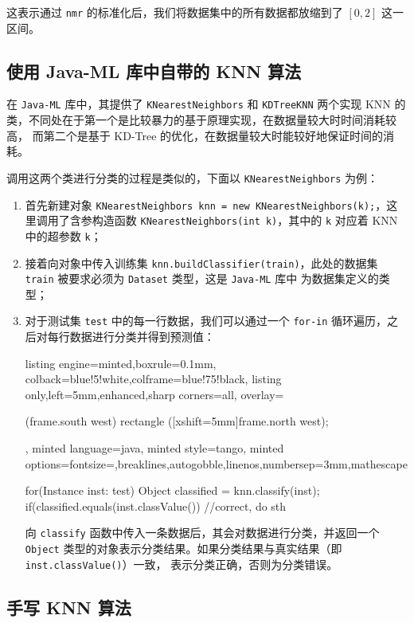 \documentclass[a4paper, 11pt, cn]{elegantpaper}
\begin{document}
这表示通过 \texttt{nmr} 的标准化后，我们将数据集中的所有数据都放缩到了 $[0, 2]$ 这一区间。
\subsection{使用 Java-ML 库中自带的 KNN 算法}

在 \texttt{Java-ML} 库中，其提供了 \texttt{KNearestNeighbors} 和 \texttt{KDTreeKNN} 两个实现 KNN 的类，不同处在于第一个是比较暴力的基于原理实现，在数据量较大时时间消耗较高，
而第二个是基于 KD-Tree 的优化，在数据量较大时能较好地保证时间的消耗。

调用这两个类进行分类的过程是类似的，下面以 \texttt{KNearestNeighbors} 为例：
\begin{enumerate}
    \item 首先新建对象 \texttt{KNearestNeighbors knn = new KNearestNeighbors(k);}，这里调用了含参构造函数 \texttt{KNearestNeighbors(int k)}，其中的 \texttt{k}
 对应着 KNN 中的超参数 \texttt{k}；
    \item 接着向对象中传入训练集 \texttt{knn.buildClassifier(train)}，此处的数据集 \texttt{train} 被要求必须为 \texttt{Dataset} 类型，这是 \texttt{Java-ML} 库中
为数据集定义的类型；
    \item 对于测试集 \texttt{test} 中的每一行数据，我们可以通过一个 \texttt{for-in} 循环遍历，之后对每行数据进行分类并得到预测值：
    \begin{tcblisting}{listing engine=minted,boxrule=0.1mm,
        colback=blue!5!white,colframe=blue!75!black,
        listing only,left=5mm,enhanced,sharp corners=all,
        overlay={\begin{tcbclipinterior} (frame.south west)
        rectangle ([xshift=5mm]frame.north west);\end{tcbclipinterior}},
        minted language=java,
        minted style=tango,
        minted options={fontsize=\small,breaklines,autogobble,linenos,numbersep=3mm,mathescape}}
for(Instance inst: test)
{
    Object classified = knn.classify(inst);
    if(classified.equals(inst.classValue())
        //correct, do sth
}
 \end{tcblisting}
    向 \texttt{classify} 函数中传入一条数据后，其会对数据进行分类，并返回一个 \texttt{Object} 类型的对象表示分类结果。如果分类结果与真实结果（即 \texttt{inst.classValue()}）一致，
    表示分类正确，否则为分类错误。
\end{enumerate}

\subsection{手写 KNN 算法}
\end{document}
